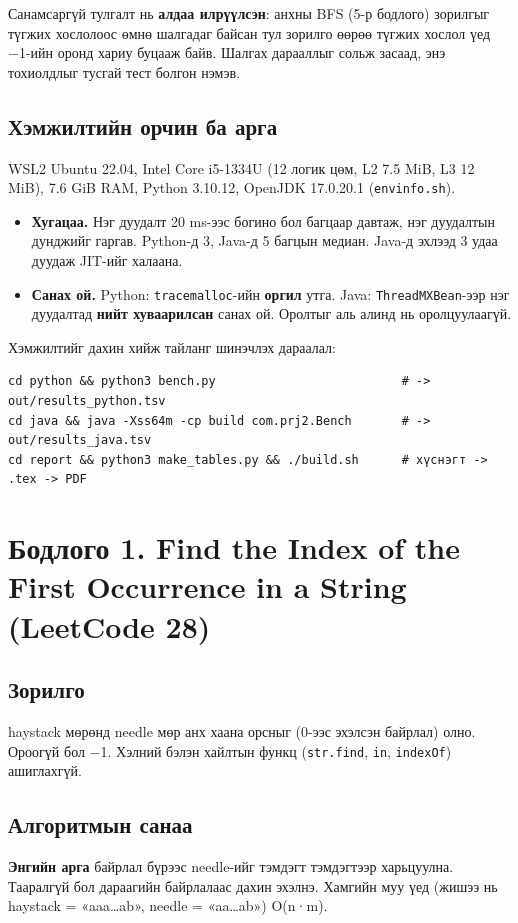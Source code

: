 \documentclass[11pt,a4paper]{article}
\renewcommand{\_}{\oldunderscore\allowbreak}
\begin{document}
Санамсаргүй тулгалт нь \textbf{алдаа илрүүлсэн}: анхны BFS (5-р бодлого) зорилгыг түгжих хослолоос өмнө шалгадаг байсан тул зорилго өөрөө түгжих хослол үед −1-ийн оронд хариу буцааж байв. Шалгах дарааллыг сольж засаад, энэ тохиолдлыг тусгай тест болгон нэмэв.

\subsection{Хэмжилтийн орчин ба арга}
WSL2 Ubuntu 22.04, Intel Core i5-1334U (12 логик цөм, L2 7.5 MiB, L3 12 MiB), 7.6 GiB RAM, Python 3.10.12, OpenJDK 17.0.20.1 (\texttt{env\_info.sh}).
\begin{itemize}
\item \textbf{Хугацаа.} Нэг дуудалт 20 ms-ээс богино бол багцаар давтаж, нэг дуудалтын дунджийг гаргав. Python-д 3, Java-д 5 багцын медиан. Java-д эхлээд 3 удаа дуудаж JIT-ийг халаана.
\item \textbf{Санах ой.} Python: \texttt{tracemalloc}-ийн \textbf{оргил} утга. Java: \texttt{ThreadMXBean}-ээр нэг дуудалтад \textbf{нийт хуваарилсан} санах ой. Оролтыг аль алинд нь оролцуулаагүй.
\end{itemize}
Хэмжилтийг дахин хийж тайланг шинэчлэх дараалал:
\begin{Verbatim}
cd python && python3 bench.py                          # -> out/results_python.tsv
cd java && java -Xss64m -cp build com.prj2.Bench       # -> out/results_java.tsv
cd report && python3 make_tables.py && ./build.sh      # хүснэгт -> .tex -> PDF
\end{Verbatim}

\section{Бодлого 1. Find the Index of the First Occurrence in a String (LeetCode 28)}

\subsection{Зорилго}
haystack мөрөнд needle мөр анх хаана орсныг (0-ээс эхэлсэн байрлал) олно. Ороогүй бол −1. Хэлний бэлэн хайлтын функц (\texttt{str.find}, \texttt{in}, \texttt{indexOf}) ашиглахгүй.

\subsection{Алгоритмын санаа}
\textbf{Энгийн арга} байрлал бүрээс needle-ийг тэмдэгт тэмдэгтээр харьцуулна. Тааралгүй бол дараагийн байрлалаас дахин эхэлнэ. Хамгийн муу үед (жишээ нь haystack = «aaa…ab», needle = «aa…ab») O(n·m).
\end{document}
